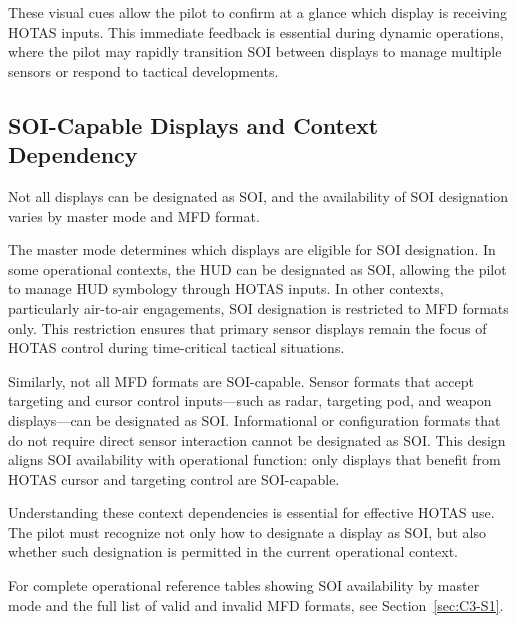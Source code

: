 \documentclass[11pt, a4paper, twoside]{report}
\begin{document}
These visual cues allow the pilot to confirm at a glance which display is receiving HOTAS inputs. This immediate feedback is essential during dynamic operations, where the pilot may rapidly transition SOI between displays to manage multiple sensors or respond to tactical developments.


\subsection{SOI-Capable Displays and Context Dependency}
\label{sec:C2-S1-S3}

Not all displays can be designated as SOI, and the availability of SOI designation varies by master mode and MFD format.

The master mode determines which displays are eligible for SOI designation. In some operational contexts, the HUD can be designated as SOI, allowing the pilot to manage HUD symbology through HOTAS inputs. In other contexts, particularly air-to-air engagements, SOI designation is restricted to MFD formats only. This restriction ensures that primary sensor displays remain the focus of HOTAS control during time-critical tactical situations.

Similarly, not all MFD formats are SOI-capable. Sensor formats that accept targeting and cursor control inputs—such as radar, targeting pod, and weapon displays—can be designated as SOI. Informational or configuration formats that do not require direct sensor interaction cannot be designated as SOI. This design aligns SOI availability with operational function: only displays that benefit from HOTAS cursor and targeting control are SOI-capable.

Understanding these context dependencies is essential for effective HOTAS use. The pilot must recognize not only how to designate a display as SOI, but also whether such designation is permitted in the current operational context.

For complete operational reference tables showing SOI availability by master mode and the full list of valid and invalid MFD formats, see Section~\ref{sec:C3-S1}.

\end{document}
